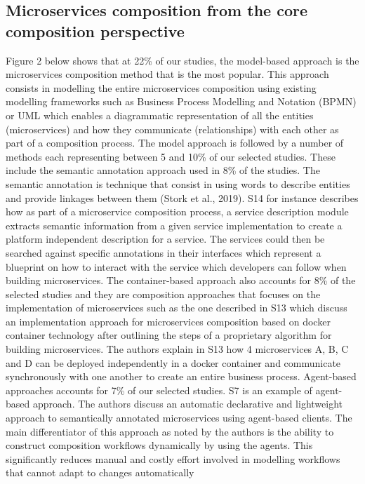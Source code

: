 \documentclass{article}
\begin{document}
\begin{multicols}{2}
\subsection{Microservices composition from the core composition perspective}


Figure 2 below shows that at 22\% of our studies, the model-based approach is the microservices composition method that is the most popular. This approach consists in modelling the entire microservices composition using existing modelling frameworks such as Business Process Modelling and Notation (BPMN) or UML which enables a diagrammatic representation of all the entities (microservices) and how they communicate (relationships) with each other as part of a composition process. The model approach is followed by a number of methods each representing between 5 and 10\% of our selected studies. These include the semantic annotation approach used in 8\% of the studies. The semantic annotation is technique that consist in using words to describe entities and provide linkages between them (Stork et al., 2019). S14 for instance describes how as part of a microservice composition process, a service description module extracts semantic information from a given service implementation to create a platform independent description for a service. The services could then be searched against specific annotations in their interfaces which represent a blueprint on how to interact with the service which developers can follow when building microservices. The container-based approach also accounts for 8\% of the selected studies and they are composition approaches that focuses on the implementation of microservices such as the one described in S13 which discuss an implementation approach for microservices composition based on docker container technology after outlining the steps of a proprietary algorithm for building microservices. The authors explain in S13 how 4 microservices A, B, C and D can be deployed independently in a docker container and communicate synchronously with one another to create an entire business process. Agent-based approaches accounts for 7\% of our selected studies. S7 is an example of agent-based approach. The authors discuss an automatic declarative and lightweight approach to semantically annotated microservices using agent-based clients. The main differentiator of this approach as noted by the authors is the ability to construct composition workflows dynamically by using the agents. This significantly reduces manual and costly effort involved in modelling workflows that cannot adapt to changes automatically 


\end{multicols}
\end{document}
